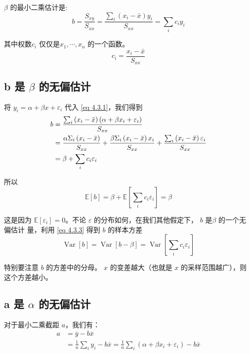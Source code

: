  $ \beta $ 的最小二乘估计是:
\begin{equation}
    b =\frac{S_{x y}}{S_{x x}}=\frac{\sum_{i}\left(x_{i}-\bar{x}\right) y_{i}}{S_{x x}} =\sum_{i} c_{i} y_{i}
    \label{eq 4.3.1}
\end{equation}

其中权数$ c_{i} $ 仅仅是$ x_{1},\cdots,x_{n}$ 的一个函数。
\begin{equation}
    c_{i}=\frac{x_{i}-\bar{x}}{S_{x x}}
    \label{eq 4.3.2}
\end{equation}

\subsection{b 是 \texorpdfstring{$\beta$}{β} 的无偏估计}  


将 $ y_{i}=\alpha+\beta x+\varepsilon_{i} $ 代入 \ref{eq 4.3.1}，我们得到
\begin{align}
    b &=\frac{\sum_{i}\left(x_{i}-\bar{x}\right)\left(\alpha+\beta x_{i}+\varepsilon_{i}\right)}{S_{x x}} \notag \\
    &=\frac{\alpha \Sigma_{i}\left(x_{i}-\bar{x}\right)}{S_{x x}}+\frac{\beta \Sigma_{i}\left(x_{i}-\bar{x}\right) x_{i}}{S_{x x}}+\frac{\sum_{i}\left(x_{i}-\bar{x}\right) \varepsilon_{i}}{S_{x x}} \label{eq 4.3.3} \\
    &=\beta+\sum_{i} c_{i} \varepsilon_{i} \notag
\end{align}

所以
\begin{equation}
    \mathbb{E}[b]=\beta+\mathbb{E}\left[\sum_{i} c_{i} \varepsilon_{i}\right]=\beta
\end{equation}

这是因为 $ \mathbb{E} \left[ \varepsilon_{i} \right] = 0 $。不论 $ \varepsilon $ 的分布如何，在我们其他假定下， $ b $ 是$ \beta $ 的一个无偏估计
量，利用 \ref{eq 4.3.3} 得到 $ b  $ 的样本方差
$$ \operatorname{Var}[b]=\operatorname{Var}[b-\beta]=\operatorname{Var}\left[\sum_{i} c_{i} \varepsilon_{i}\right] $$

特别要注意 $ b $ 的方差中的分母。 $ x $ 的变差越大（也就是 $ x $ 的采样范围越广），则这个方差越小。

\subsection{a 是 \texorpdfstring{$ \alpha $}{α} 的无偏估计} 

对于最小二乘截距 $ a $，我们有：
\begin{align*} 
    a & =\bar{y}-b \bar{x} \\ &=\frac{1}{n} \sum_{i} y_{i}-b \bar{x} 
        =\frac{1}{n} \sum_{i}\left(\alpha+\beta x_{i}+\varepsilon_{i}\right)-b \bar{x}
\end{align*}

